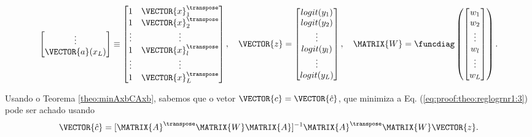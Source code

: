 \begin{myproofT}
\begin{equation}
\begin{bmatrix}
\vdots\\
\VECTOR{a}(x_L)\\
\end{bmatrix}
\equiv
\begin{bmatrix}
1 & \VECTOR{x}_1^{\transpose}\\
1 & \VECTOR{x}_2^{\transpose}\\
\vdots & \vdots\\
1 & \VECTOR{x}_l^{\transpose}\\
\vdots & \vdots\\
1 & \VECTOR{x}_L^{\transpose}\\ 
\end{bmatrix},
\quad
\VECTOR{z}=
\begin{bmatrix}
logit(y_1)  \\
logit(y_2)  \\
\vdots  \\
logit(y_l)  \\
\vdots \\
logit(y_L) \\
\end{bmatrix},
\quad
\MATRIX{W}=\funcdiag \left(
\begin{bmatrix}
w_1 \\
w_2 \\
\vdots  \\
w_l \\
\vdots \\
w_L \\
\end{bmatrix} \right).
\end{equation}


Usando o Teorema \ref{theo:minAxbCAxb}, sabemos que o vetor $\VECTOR{c}=\VECTOR{\hat{c}}$,
que minimiza a Eq. (\ref{eq:proof:theo:reglogrnr1:3}) pode ser achado usando 
\begin{equation}\label{eq:proof:theo:reglogrnr1:5}
\VECTOR{\hat{c}}=[\MATRIX{A}^{\transpose}\MATRIX{W}\MATRIX{A}]^{-1}\MATRIX{A}^{\transpose}\MATRIX{W}\VECTOR{z}.
\end{equation}
\end{myproofT}

